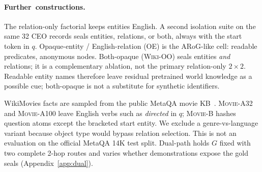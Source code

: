 \documentclass{article}
\begin{document}
\paragraph{\mbox{Further constructions.}}
The relation-only factorial keeps entities English. A second isolation suite
on the same 32 CEO records seals entities, relations, or both, always with
the start token in $q$. Opaque-entity / English-relation (OE) is the
ARoG-like cell: readable predicates, anonymous nodes. Both-opaque
(\textsc{Wiki-OO}) seals entities \emph{and} relations; it is a
complementary ablation, not the primary relation-only $2{\times}2$. Readable
entity names therefore leave residual pretrained world knowledge as a
possible cue; both-opaque is not a substitute for synthetic identifiers.

WikiMovies facts are sampled from the public MetaQA movie
KB~\citep{miller2016wikimovies,zhang2018metaqa}.
\textsc{Movie-A32} and \textsc{Movie-A100} leave English verbs such as
\emph{directed} in $q$;
\textsc{Movie-B} hashes question atoms except the bracketed start entity.
We exclude a genre-vs-language variant because object type would bypass
relation selection. This is not an evaluation on the official MetaQA 14K
test split. Dual-path holds $G$ fixed with two complete 2-hop routes and
varies whether demonstrations expose the gold seals
(Appendix~\ref{app:dual}).
\end{document}
